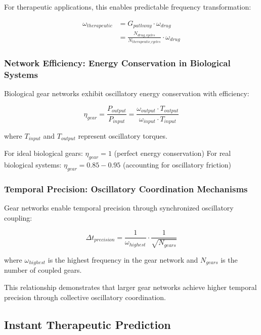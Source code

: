 \documentclass[12pt,a4paper]{article}
\begin{document}
For therapeutic applications, this enables predictable frequency transformation:

\begin{align}
\omega_{therapeutic} &= G_{pathway} \cdot \omega_{drug} \\
&= \frac{N_{drug\_cycles}}{N_{therapeutic\_cycles}} \cdot \omega_{drug}
\end{align}

\subsubsection{Network Efficiency: Energy Conservation in Biological Systems}

Biological gear networks exhibit oscillatory energy conservation with efficiency:

\begin{equation}
\eta_{gear} = \frac{P_{output}}{P_{input}} = \frac{\omega_{output} \cdot T_{output}}{\omega_{input} \cdot T_{input}}
\end{equation}

where $T_{input}$ and $T_{output}$ represent oscillatory torques.

For ideal biological gears: $\eta_{gear} = 1$ (perfect energy conservation)
For real biological systems: $\eta_{gear} = 0.85 - 0.95$ (accounting for oscillatory friction)

\subsubsection{Temporal Precision: Oscillatory Coordination Mechanisms}

Gear networks enable temporal precision through synchronized oscillatory coupling:

\begin{equation}
\Delta t_{precision} = \frac{1}{\omega_{highest}} \cdot \frac{1}{\sqrt{N_{gears}}}
\end{equation}

where $\omega_{highest}$ is the highest frequency in the gear network and $N_{gears}$ is the number of coupled gears.

This relationship demonstrates that larger gear networks achieve higher temporal precision through collective oscillatory coordination.

\subsection{Instant Therapeutic Prediction}
\end{document}
